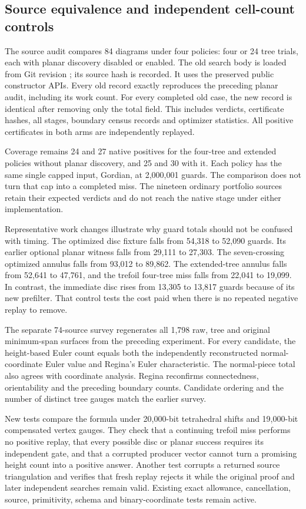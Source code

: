 \subsection{Source equivalence and independent cell-count controls}

The source audit compares 84 diagrams under four policies: four or 24
tree trials, each with planar discovery disabled or enabled. The old
search body is loaded from Git revision ; its source hash
is recorded. It uses the preserved public constructor APIs. Every old
record exactly reproduces the preceding planar audit, including its work
count. For every completed old case, the new record is identical after
removing only the total  field. This includes verdicts,
certificate hashes, all stages, boundary census records and optimizer
statistics. All positive certificates in both arms are independently
replayed.

Coverage remains 24 and 27 native positives for the four-tree and extended
policies without planar discovery, and 25 and 30 with it. Each policy has
the same single capped input, Gordian, at 2,000,001 guards. The comparison
does not turn that cap into a completed miss. The nineteen ordinary
portfolio sources retain their expected verdicts and do not reach the
native stage under either implementation.

Representative work changes illustrate why guard totals should not be
confused with timing. The optimized disc fixture falls from 54,318 to
52,090 guards. Its earlier optional planar witness falls from 29,111 to
27,303. The seven-crossing optimized annulus falls from 93,012 to 89,862.
The extended-tree  annulus falls from 52,641 to 47,761,
and the trefoil four-tree miss falls from 22,041 to 19,099. In contrast,
the immediate  disc rises from 13,305 to 13,817 guards
because of its new prefilter. That control tests the cost paid when there
is no repeated negative replay to remove.

The separate 74-source survey regenerates all 1,798 raw, tree and original
minimum-span surfaces from the preceding experiment. For every candidate,
the height-based Euler count equals both the independently reconstructed
normal-coordinate Euler value and Regina's Euler characteristic. The
normal-piece total also agrees with coordinate analysis. Regina reconfirms
connectedness, orientability and the preceding boundary counts. Candidate
ordering and the number of distinct tree gauges match the earlier survey.

New tests compare the formula under 20,000-bit tetrahedral shifts and
19,000-bit compensated vertex gauges. They check that a continuing trefoil
miss performs no positive replay, that every possible disc or planar
success requires its independent gate, and that a corrupted producer
vector cannot turn a promising height count into a positive answer.
Another test corrupts a returned source triangulation and verifies that
fresh replay rejects it while the original proof and later independent
searches remain valid. Existing exact allowance, cancellation, source,
primitivity, schema and binary-coordinate tests remain active.



